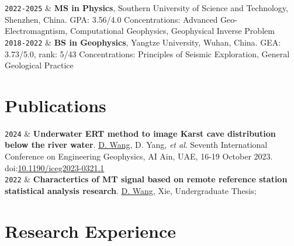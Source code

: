 \documentclass[10pt,a4paper]{article}
\newcommand{\SUSTech}{Southern University of Science and Technology}
\newcommand{\Yangtz}{Yangtze University}
\newcommand{\LastName}{Wang}
\newcommand{\Initials}{D}
\newcommand{\Me}{\underline{\Initials. \LastName}}  %
\newcommand{\DikunYang}{D. Yang}
\newcommand{\Duration}[2]{\fontsize{10pt}{0}\selectfont \texttt{#1-#2}}
\newcommand{\Year}[1]{\fontsize{10pt}{0}\selectfont \texttt{#1}}
\newcommand{\DOI}[1]{doi:\href{https://doi.org/#1}{#1}}
\begin{document}
\begin{EntriesTableDuration}
  \Duration{2022}{2025}  &
  \textbf{MS in Physics}, \SUSTech, Shenzhen, China.
  \newline
  GPA: 3.56/4.0
  \newline
  Concentrations: Advanced Geo-Electromagntism, Computational Geophysics, Geophysical Inverse Problem 
  \\
  \Duration{2018}{2022}  &
  \textbf{BS in Geophysics}, \Yangtz, Wuhan, China.
  \newline
  GEA: 3.73/5.0, rank: 5/43
  \newline
  Concentrations: Principles of Seismic Exploration, General Geological Practice
\end{EntriesTableDuration}

\section{Publications}

\begin{EntriesTableYear}
  \Year{2024} &
  \textbf{Underwater ERT method to image Karst cave distribution below the river water}.
  \newline
  \Me, \DikunYang, \emph{et al}.
  Seventh International Conference on Engineering Geophysics, AI Ain, UAE, 16-19 October 2023.
  doi:\href{https://library.seg.org/doi/10.1190/iceg2023-032.1}{10.1190/iceg2023-0321.1}
  \\
  \Year{2022} &
  \textbf{Charactertics of MT signal based on remote reference station statistical analysis research}.
  \newline
  \Me, Xie,
  Undergraduate Thesis; 
\end{EntriesTableYear}

\section{Research Experience}
\end{document}
